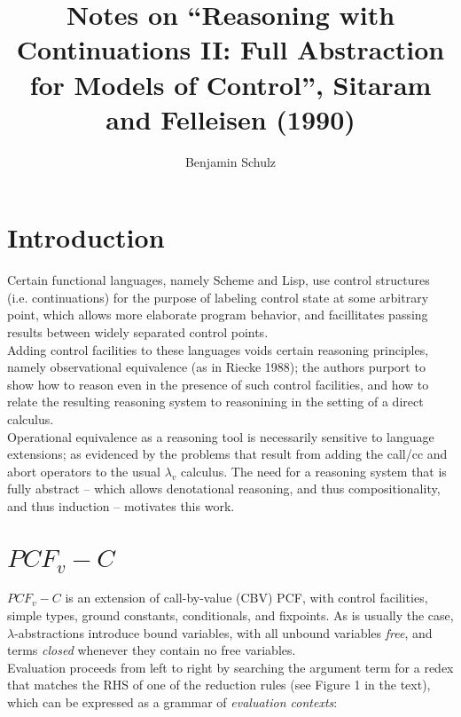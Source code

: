 \documentclass[a4paper,10pt]{article}
\title{Notes on ``Reasoning with Continuations II: Full Abstraction for Models of Control'',
Sitaram and Felleisen (1990)}
\author{Benjamin Schulz}
\begin{document}
\maketitle

\begin{abstract}

\end{abstract}

\section{Introduction}

Certain functional languages, namely Scheme and Lisp, use control structures (i.e. continuations)
for the purpose of labeling control state at some arbitrary point, which allows more elaborate
program behavior, and facillitates passing results between widely separated control points.\\

Adding control facilities to these languages voids certain reasoning principles, namely observational
equivalence (as in Riecke 1988); the authors purport to show how to reason even in the presence of
such control facilities, and how to relate the resulting reasoning system to reasonining in the
setting of a direct calculus.\\

Operational equivalence as a reasoning tool is necessarily sensitive to language extensions;
as evidenced by the problems that result from adding the call/cc and abort operators to the usual
$\lambda_v$ calculus.  The need for a reasoning system that is fully abstract -- which allows
denotational reasoning, and thus compositionality, and thus induction -- motivates this work.\\

\section{$PCF_v-C$}

$PCF_v-C$ is an extension of call-by-value (CBV) PCF, with control facilities, simple types, ground
constants, conditionals, and fixpoints.  As is usually the case, $\lambda$-abstractions introduce
bound variables, with all unbound variables \emph{free}, and terms \emph{closed} whenever they
contain no free variables.\\

Evaluation proceeds from left to right by searching the argument term for a redex that matches
the RHS of one of the reduction rules (see Figure 1 in the text), which can be expressed as a 
grammar of \emph{evaluation contexts}:\\
\end{document}
